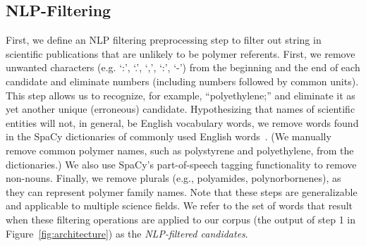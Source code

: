 \subsection{NLP-Filtering}\label{sec:filter}

First, we define an
NLP filtering preprocessing step to filter out
string
 in scientific publications that are unlikely to be polymer referents. 
First, we remove
unwanted characters (e.g. `:', `.', `,', `:', `-') from the beginning and the end of each
candidate and eliminate numbers (including numbers followed by common units).
This step allows us to recognize, for example, ``polyethylene;'' and eliminate it as yet another unique (erroneous) candidate. 
Hypothesizing that names of scientific entities will not, in general, be English
vocabulary words, we remove words found in the SpaCy dictionaries
of commonly used English words~\cite{choi2015depends}. (We manually remove common polymer
names, such as polystyrene and polyethylene, from the dictionaries.) 
We also use
SpaCy's part-of-speech tagging functionality to remove non-nouns.  
Finally, we remove plurals (e.g.,
polyamides, polynorbornenes), as they can represent polymer family names.
Note that these steps are generalizable and applicable to multiple science fields.
We refer to the set of words that result when these filtering operations are applied to our corpus (the output of step 1 in Figure~\ref{fig:architecture}) as the \emph{NLP-filtered candidates}.


